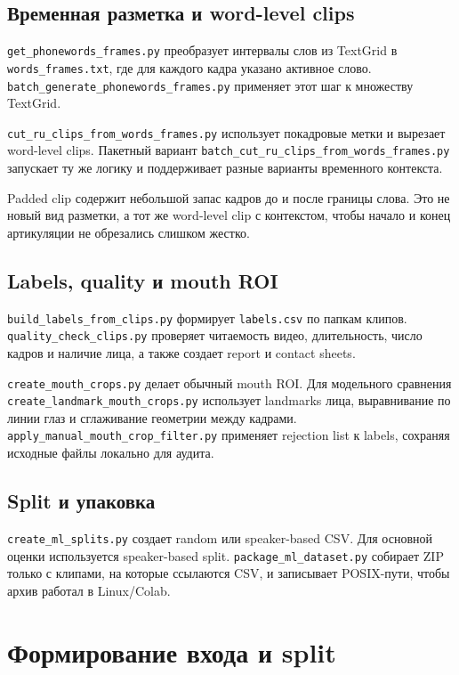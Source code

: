 \documentclass[12pt,a4paper]{article}
\begin{document}
\subsection{Временная разметка и word-level clips}

\texttt{get\_phonewords\_frames.py} преобразует интервалы слов из TextGrid
в \texttt{words\_frames.txt}, где для каждого кадра указано активное слово.
\texttt{batch\_generate\_phonewords\_frames.py} применяет этот шаг к
множеству TextGrid.

\texttt{cut\_ru\_clips\_from\_words\_frames.py} использует покадровые
метки и вырезает word-level clips. Пакетный вариант
\texttt{batch\_cut\_ru\_clips\_from\_words\_frames.py} запускает ту же
логику и поддерживает разные варианты временного контекста.

Padded clip содержит небольшой запас кадров до и после границы слова. Это
не новый вид разметки, а тот же word-level clip с контекстом, чтобы начало
и конец артикуляции не обрезались слишком жестко.

\subsection{Labels, quality и mouth ROI}

\texttt{build\_labels\_from\_clips.py} формирует \texttt{labels.csv} по
папкам клипов. \texttt{quality\_check\_clips.py} проверяет читаемость
видео, длительность, число кадров и наличие лица, а также создает report
и contact sheets.

\texttt{create\_mouth\_crops.py} делает обычный mouth ROI. Для модельного
сравнения \texttt{create\_landmark\_mouth\_crops.py} использует landmarks
лица, выравнивание по линии глаз и сглаживание геометрии между кадрами.
\texttt{apply\_manual\_mouth\_crop\_filter.py} применяет rejection list
к labels, сохраняя исходные файлы локально для аудита.

\subsection{Split и упаковка}

\texttt{create\_ml\_splits.py} создает random или speaker-based CSV. Для
основной оценки используется speaker-based split.
\texttt{package\_ml\_dataset.py} собирает ZIP только с клипами, на которые
ссылаются CSV, и записывает POSIX-пути, чтобы архив работал в Linux/Colab.

\section{Формирование входа и split}
\end{document}
